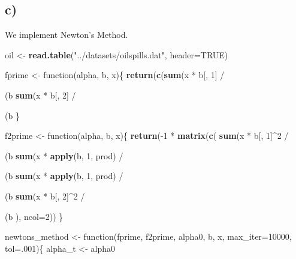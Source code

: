 \documentclass[]{article}
\newenvironment{Shaded}{\begin{snugshade}}{\end{snugshade}}
\newcommand{\KeywordTok}[1]{\textcolor[rgb]{0.13,0.29,0.53}{\textbf{{#1}}}}
\newcommand{\DataTypeTok}[1]{\textcolor[rgb]{0.13,0.29,0.53}{{#1}}}
\newcommand{\DecValTok}[1]{\textcolor[rgb]{0.00,0.00,0.81}{{#1}}}
\newcommand{\StringTok}[1]{\textcolor[rgb]{0.31,0.60,0.02}{{#1}}}
\newcommand{\OtherTok}[1]{\textcolor[rgb]{0.56,0.35,0.01}{{#1}}}
\newcommand{\NormalTok}[1]{{#1}}
\begin{document}
\subsection{c)}\label{c}

We implement Newton's Method.

\begin{Shaded}
\begin{Highlighting}[]
\NormalTok{oil <-}\StringTok{ }\KeywordTok{read.table}\NormalTok{(}\StringTok{"../datasets/oilspills.dat"}\NormalTok{, }\DataTypeTok{header=}\OtherTok{TRUE}\NormalTok{)}

\NormalTok{fprime <-}\StringTok{ }\NormalTok{function(alpha, b, x)\{}
  \KeywordTok{return}\NormalTok{(}\KeywordTok{c}\NormalTok{(}\KeywordTok{sum}\NormalTok{(x *}\StringTok{ }\NormalTok{b[, }\DecValTok{1}\NormalTok{] /}\StringTok{ }\NormalTok{(b %
           \KeywordTok{sum}\NormalTok{(x *}\StringTok{ }\NormalTok{b[, }\DecValTok{2}\NormalTok{] /}\StringTok{  }\NormalTok{(b %
\NormalTok{\}}

\NormalTok{f2prime <-}\StringTok{ }\NormalTok{function(alpha, b, x)\{}
  \KeywordTok{return}\NormalTok{(-}\DecValTok{1} \NormalTok{*}\StringTok{ }\KeywordTok{matrix}\NormalTok{(}\KeywordTok{c}\NormalTok{(}
    \KeywordTok{sum}\NormalTok{(x *}\StringTok{ }\NormalTok{b[, }\DecValTok{1}\NormalTok{]^}\DecValTok{2} \NormalTok{/}\StringTok{ }\NormalTok{(b %
    \KeywordTok{sum}\NormalTok{(x *}\StringTok{ }\KeywordTok{apply}\NormalTok{(b, }\DecValTok{1}\NormalTok{, prod) /}\StringTok{ }\NormalTok{(b %
    \KeywordTok{sum}\NormalTok{(x *}\StringTok{ }\KeywordTok{apply}\NormalTok{(b, }\DecValTok{1}\NormalTok{, prod) /}\StringTok{ }\NormalTok{(b %
    \KeywordTok{sum}\NormalTok{(x *}\StringTok{ }\NormalTok{b[, }\DecValTok{2}\NormalTok{]^}\DecValTok{2} \NormalTok{/}\StringTok{ }\NormalTok{(b %
  \NormalTok{), }\DataTypeTok{ncol=}\DecValTok{2}\NormalTok{))}
\NormalTok{\}}


\NormalTok{newtons_method <-}\StringTok{ }\NormalTok{function(fprime, f2prime, alpha0, b, x, }\DataTypeTok{max_iter=}\DecValTok{10000}\NormalTok{, }\DataTypeTok{tol=}\NormalTok{.}\DecValTok{001}\NormalTok{)\{}
  \NormalTok{alpha_t <-}\StringTok{ }\NormalTok{alpha0}
  
}}}}}}
\end{Highlighting}
\end{Shaded}
\end{document}
